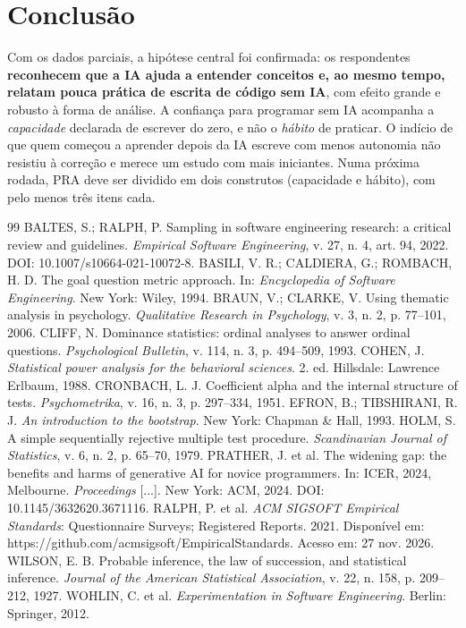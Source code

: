 \documentclass[12pt,a4paper]{article}
\begin{document}
\section{Conclusão}

Com os dados parciais, a hipótese central foi confirmada: os respondentes \textbf{reconhecem que a IA ajuda a entender conceitos e, ao mesmo tempo, relatam pouca prática de escrita de código sem IA}, com efeito grande e robusto à forma de análise. A confiança para programar sem IA acompanha a \emph{capacidade} declarada de escrever do zero, e não o \emph{hábito} de praticar. O indício de que quem começou a aprender depois da IA escreve com menos autonomia não resistiu à correção e merece um estudo com mais iniciantes. Numa próxima rodada, PRA deve ser dividido em dois construtos (capacidade e hábito), com pelo menos três itens cada.

\begingroup
\singlespacing
\renewcommand{\refname}{Referências}
\raggedright
\setlength{\parindent}{0pt}
\begin{thebibliography}{99}\setlength{\itemsep}{3pt}\setlength{\parskip}{0pt}
 BALTES, S.; RALPH, P. Sampling in software engineering research: a critical review and guidelines. \emph{Empirical Software Engineering}, v. 27, n. 4, art. 94, 2022. DOI: 10.1007/s10664-021-10072-8.
 BASILI, V. R.; CALDIERA, G.; ROMBACH, H. D. The goal question metric approach. In: \emph{Encyclopedia of Software Engineering}. New York: Wiley, 1994.
 BRAUN, V.; CLARKE, V. Using thematic analysis in psychology. \emph{Qualitative Research in Psychology}, v. 3, n. 2, p. 77--101, 2006.
 CLIFF, N. Dominance statistics: ordinal analyses to answer ordinal questions. \emph{Psychological Bulletin}, v. 114, n. 3, p. 494--509, 1993.
 COHEN, J. \emph{Statistical power analysis for the behavioral sciences}. 2. ed. Hillsdale: Lawrence Erlbaum, 1988.
 CRONBACH, L. J. Coefficient alpha and the internal structure of tests. \emph{Psychometrika}, v. 16, n. 3, p. 297--334, 1951.
 EFRON, B.; TIBSHIRANI, R. J. \emph{An introduction to the bootstrap}. New York: Chapman \& Hall, 1993.
 HOLM, S. A simple sequentially rejective multiple test procedure. \emph{Scandinavian Journal of Statistics}, v. 6, n. 2, p. 65--70, 1979.
 PRATHER, J. et al. The widening gap: the benefits and harms of generative AI for novice programmers. In: ICER, 2024, Melbourne. \emph{Proceedings} [...]. New York: ACM, 2024. DOI: 10.1145/3632620.3671116.
 RALPH, P. et al. \emph{ACM SIGSOFT Empirical Standards}: Questionnaire Surveys; Registered Reports. 2021. Disponível em: https://github.com/acmsigsoft/EmpiricalStandards. Acesso em: 27 nov. 2026.
 WILSON, E. B. Probable inference, the law of succession, and statistical inference. \emph{Journal of the American Statistical Association}, v. 22, n. 158, p. 209--212, 1927.
 WOHLIN, C. et al. \emph{Experimentation in Software Engineering}. Berlin: Springer, 2012.
\end{thebibliography}
\endgroup
\end{document}
